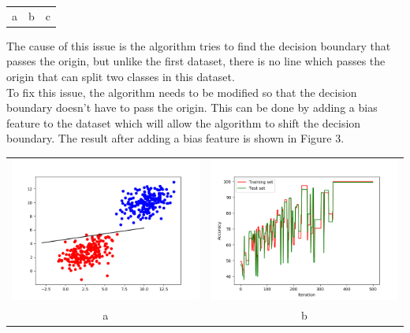 \documentclass{article}
\begin{document}
\begin{center}
\begin{tabular}{ccc}
\scriptsize a & \scriptsize b & \scriptsize c\\
\end{tabular}
\end{center}

The cause of this issue is the algorithm tries to find the decision boundary that passes the origin, but unlike the first dataset, there is no line which passes the origin that can split two classes in this dataset.\\
\indent To fix this issue, the algorithm needs to be modified so that the decision boundary doesn't have to pass the origin. This can be done by adding a bias feature to the dataset which will allow the algorithm to shift the decision boundary. The result after adding a bias feature is shown in Figure 3.

\begin{center}
\begin{tabular}{cc}
\includegraphics[scale=0.3]{sample2_decision_doundary_bias} &
\includegraphics[scale=0.3]{learning_curve_sample2_bias} \\
\scriptsize a & \scriptsize b\\
\end{tabular}
\end{center}
\end{document}
